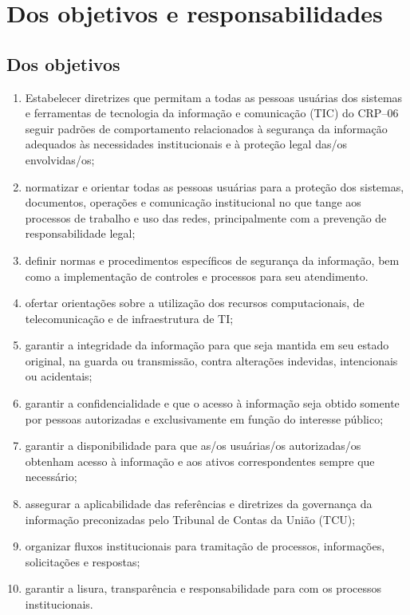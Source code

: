 \chapter{Dos objetivos e responsabilidades}

\section{Dos objetivos}

\begin{enumerate}

\item
    Estabelecer diretrizes que permitam a todas as pessoas usuárias dos
    sistemas e ferramentas de tecnologia da informação e comunicação (TIC)
    do CRP--06 seguir padrões de comportamento relacionados à segurança da
    informação adequados às necessidades institucionais e à proteção legal
    das/os envolvidas/os;
\item
    normatizar e orientar todas as pessoas usuárias para a proteção dos
    sistemas, documentos, operações e comunicação institucional no que
    tange aos processos de trabalho e uso das redes, principalmente com a
    prevenção de responsabilidade legal;
\item
    definir normas e procedimentos específicos de segurança da informação,
    bem como a implementação de controles e processos para seu
    atendimento.
\item
    ofertar orientações sobre a utilização dos recursos computacionais, de
    telecomunicação e de infraestrutura de TI;
\item
    garantir a integridade da informação para que seja mantida em seu
    estado original, na guarda ou transmissão, contra alterações
    indevidas, intencionais ou acidentais;
\item
    garantir a confidencialidade e que o acesso à informação seja obtido
    somente por pessoas autorizadas e exclusivamente em função do
    interesse público;
\item
    garantir a disponibilidade para que as/os usuárias/os autorizadas/os
    obtenham acesso à informação e aos ativos correspondentes sempre que
    necessário;
\item
    assegurar a aplicabilidade das referências e diretrizes da governança
    da informação preconizadas pelo Tribunal de Contas da União (TCU);
\item
    organizar fluxos institucionais para tramitação de processos,
    informações, solicitações e respostas;
\item
    garantir a lisura, transparência e responsabilidade para com os
    processos institucionais.
\end{enumerate}

